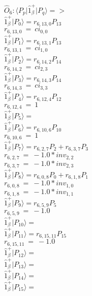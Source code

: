 \documentclass[14pt]{article}
\begin{document}
    $\hat{O}_{6}:  \langle{P_p}\vert \hat{1}_{\beta}^{+} \vert{P_q}\rangle => $ \\ 
    $ \hat{1}_{\beta}^{+} \vert{P_{0}}\rangle = {r}_{6,13,0}P_{13} $ \\ 
    ${r}_{6,13,0}\ =\ {ci}_{0,0} $ \\ 
    $ \hat{1}_{\beta}^{+} \vert{P_{1}}\rangle = {r}_{6,13,1}P_{13} $ \\ 
    ${r}_{6,13,1}\ =\ {ci}_{1,0} $ \\ 
    $ \hat{1}_{\beta}^{+} \vert{P_{2}}\rangle = {r}_{6,14,2}P_{14} $ \\ 
    ${r}_{6,14,2}\ =\ {ci}_{2,3} $ \\ 
    $ \hat{1}_{\beta}^{+} \vert{P_{3}}\rangle = {r}_{6,14,3}P_{14} $ \\ 
    ${r}_{6,14,3}\ =\ {ci}_{3,3} $ \\ 
    $ \hat{1}_{\beta}^{+} \vert{P_{4}}\rangle = {r}_{6,12,4}P_{12} $ \\ 
    ${r}_{6,12,4}\ =\ 1 $ \\ 
    $ \hat{1}_{\beta}^{+} \vert{P_{5}}\rangle =  $ \\ 
    $ \hat{1}_{\beta}^{+} \vert{P_{6}}\rangle = {r}_{6,10,6}P_{10} $ \\ 
    ${r}_{6,10,6}\ =\ 1 $ \\ 
    $ \hat{1}_{\beta}^{+} \vert{P_{7}}\rangle = {r}_{6,2,7}P_{2}+{r}_{6,3,7}P_{3} $ \\ 
    ${r}_{6,2,7}\ =\ -1.0*{inv}_{2,2} $ \\ 
    ${r}_{6,3,7}\ =\ -1.0*{inv}_{2,3} $ \\ 
    $ \hat{1}_{\beta}^{+} \vert{P_{8}}\rangle = {r}_{6,0,8}P_{0}+{r}_{6,1,8}P_{1} $ \\ 
    ${r}_{6,0,8}\ =\ -1.0*{inv}_{1,0} $ \\ 
    ${r}_{6,1,8}\ =\ -1.0*{inv}_{1,1} $ \\ 
    $ \hat{1}_{\beta}^{+} \vert{P_{9}}\rangle = {r}_{6,5,9}P_{5} $ \\ 
    ${r}_{6,5,9}\ =\ -1.0 $ \\ 
    $ \hat{1}_{\beta}^{+} \vert{P_{10}}\rangle =  $ \\ 
    $ \hat{1}_{\beta}^{+} \vert{P_{11}}\rangle = {r}_{6,15,11}P_{15} $ \\ 
    ${r}_{6,15,11}\ =\ -1.0 $ \\ 
    $ \hat{1}_{\beta}^{+} \vert{P_{12}}\rangle =  $ \\ 
    $ \hat{1}_{\beta}^{+} \vert{P_{13}}\rangle =  $ \\ 
    $ \hat{1}_{\beta}^{+} \vert{P_{14}}\rangle =  $ \\ 
    $ \hat{1}_{\beta}^{+} \vert{P_{15}}\rangle =  $ \\ 
    
\end{document}
